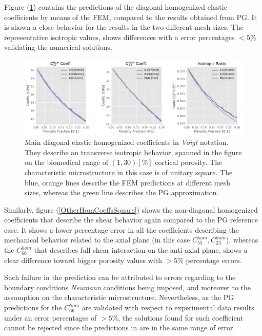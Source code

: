 Figure (\ref{MainHomCoeffsSquare}) contains the predictions of the diagonal homogenized elastic coefficients by means of the FEM, compared to the results obtained from PG.
It is shown a close behavior for the results in the two different mesh sizes. The representative isotropic values, shows differences with a error percentages $< 5 \%$ validating the numerical solutions.

\begin{figure}[!h]
	\centering
	\includegraphics[scale=.5]{images/CellsProb/CellProb_MainHomCoeffsCircular.pdf}
	\caption{Main diagonal elastic homogenized coefficients in \textit{Voigt} notation. They describe an transverse isotropic behavior, spanned in the figure on the biomedical range of $(1,30) [\%]$ cortical porosity. The characteristic microstructure in this case is of unitary square. The blue, orange lines describe the FEM predictions at different mesh sizes, whereas the green line describes the PG approximation.}
	\label{MainHomCoeffsSquare}
\end{figure}

Similarly, figure (\ref{OtherHomCoeffsSquare}) shows the non-diagonal homogenized coefficients that describe the shear behavior again compared to the PG reference case.
It shows a lower percentage error in all the coefficients describing the mechanical behavior related to the axial plane (in this case $C_{55}^{hom}, C_{23}^{hom}$), whereas the $C_{66}^{hom}$ that describes full shear interaction on the anti-axial plane, shows a clear difference toward bigger porosity values with $> 5\%$ percentage errors. 

Such failure in the prediction can be attributed to errors regarding to the boundary conditions \textit{Neumann} conditions being imposed, and moreover to the assumption on the characteristic microstructure. Nevertheless, as the PG predictions for the $C_{66}^{hom}$ are validated with respect to experimental data results under an error percentages of $> 5 \%$, the solutions found for such coefficient cannot be rejected since the predictions in are in the same range of error.

